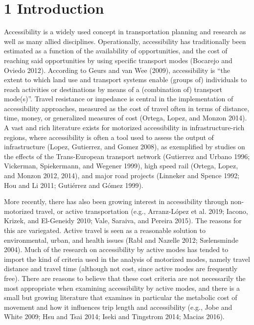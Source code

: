 \documentclass[]{elsarticle} %
\begin{document}
\hypertarget{introduction}{%
\section{1 Introduction}\label{introduction}}

Accessibility is a widely used concept in transportation planning and
research as well as many allied disciplines. Operationally,
accessibility has traditionally been estimated as a function of the
availability of opportunities, and the cost of reaching said
opportunities by using specific transport modes (Bocarejo and Oviedo
2012). According to Geurs and van Wee (2009), accessibility is ``the
extent to which land use and transport systems enable (groups of)
individuals to reach activities or destinations by means of a
(combination of) transport mode(s)''. Travel resistance or impedance is
central in the implementation of accessibility approaches, measured as
the cost of travel often in terms of distance, time, money, or
generalized measures of cost (Ortega, Lopez, and Monzon 2014). A vast
and rich literature exists for motorized accessibility in
infrastructure-rich regions, where accessibility is often a tool used to
assess the output of infrastructure (Lopez, Gutierrez, and Gomez 2008),
as exemplified by studies on the effects of the Trans-European transport
network (Gutierrez and Urbano 1996; Vickerman, Spiekermann, and Wegener
1999), high speed rail (Ortega, Lopez, and Monzon 2012, 2014), and major
road projects (Linneker and Spence 1992; Hou and Li 2011; Gutiérrez and
Gómez 1999).

More recently, there has also been growing interest in accessibility
through non-motorized travel, or active transportation (e.g.,
Arranz-López et al. 2019; Iacono, Krizek, and El-Geneidy 2010; Vale,
Saraiva, and Pereira 2015). The reasons for this are variegated. Active
travel is seen as a reasonable solution to environmental, urban, and
health issues (Rabl and Nazelle 2012; Sælensminde 2004). Much of the
research on accessibility by active modes has tended to import the kind
of criteria used in the analysis of motorized modes, namely travel
distance and travel time (although not cost, since active modes are
frequently free). There are reasons to believe that these cost criteria
are not necessarily the most appropriate when examining accessibility by
active modes, and there is a small but growing literature that examines
in particular the metabolic cost of movement and how it influences trip
length and accessibility (e.g., Jobe and White 2009; Hsu and Tsai 2014;
Iseki and Tingstrom 2014; Macias 2016).
\end{document}
